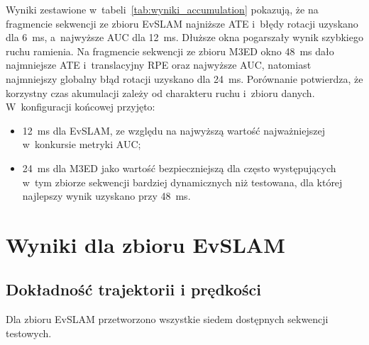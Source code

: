 \clearpage

Wyniki zestawione w~tabeli~\ref{tab:wyniki_accumulation} pokazują, że na fragmencie sekwencji ze zbioru EvSLAM najniższe ATE i~błędy rotacji uzyskano dla 6~ms, a~najwyższe AUC dla 12~ms. Dłuższe okna pogarszały wynik szybkiego ruchu ramienia. Na fragmencie sekwencji ze zbioru M3ED okno 48~ms dało najmniejsze ATE i~translacyjny RPE oraz najwyższe AUC, natomiast najmniejszy globalny błąd rotacji uzyskano dla 24~ms. Porównanie potwierdza, że korzystny czas akumulacji zależy od charakteru ruchu i~zbioru danych. W~konfiguracji końcowej przyjęto:
\begin{itemize}
    \item 12~ms dla EvSLAM, ze względu na najwyższą wartość najważniejszej w~konkursie metryki AUC;
    \item 24~ms dla M3ED jako wartość bezpieczniejszą dla często występujących w~tym zbiorze sekwencji bardziej dynamicznych niż testowana, dla której najlepszy wynik uzyskano przy 48~ms.
\end{itemize}

\section{Wyniki dla zbioru EvSLAM}
\label{sec:wyniki_evslam}

\subsection{Dokładność trajektorii i prędkości}
\label{subsec:wyniki_evslam_metryki}

Dla zbioru EvSLAM przetworzono wszystkie siedem dostępnych sekwencji testowych.

